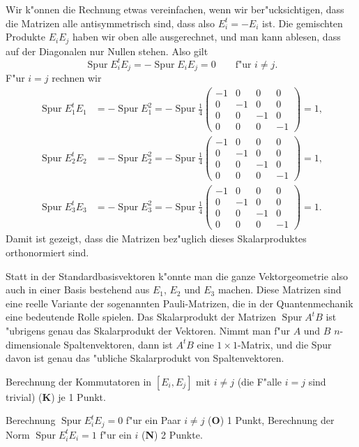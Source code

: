 \begin{loesung}
\begin{teilaufgaben}
Wir k"onnen die Rechnung etwas vereinfachen, wenn wir ber"ucksichtigen,
dass die Matrizen alle antisymmetrisch sind, dass also $E_i^t=-E_i$ ist.
Die gemischten Produkte $E_iE_j$ haben wir oben alle ausgerechnet, und
man kann ablesen, dass auf der Diagonalen nur Nullen stehen. Also gilt
\[
\operatorname{Spur}E_i^tE_j
=
-\operatorname{Spur}E_iE_j=0
\qquad
\text{f"ur $i\ne j$}.
\]
F"ur $i=j$ rechnen wir
\begin{align*}
\operatorname{Spur}E_1^tE_1
&=-\operatorname{Spur}E_1^2
=-\operatorname{Spur}\frac14\begin{pmatrix}
-1& 0& 0& 0\\
 0&-1& 0& 0\\
 0& 0&-1& 0\\
 0& 0& 0&-1
\end{pmatrix}
=1,
\\
\operatorname{Spur}E_2^tE_2
&=-\operatorname{Spur}E_2^2
=-\operatorname{Spur}\frac14\begin{pmatrix}
-1& 0& 0& 0\\
 0&-1& 0& 0\\
 0& 0&-1& 0\\
 0& 0& 0&-1
\end{pmatrix}
=1,
\\
\operatorname{Spur}E_3^tE_3
&=-\operatorname{Spur}E_3^2
=-\operatorname{Spur}\frac14\begin{pmatrix}
-1& 0& 0& 0\\
 0&-1& 0& 0\\
 0& 0&-1& 0\\
 0& 0& 0&-1
\end{pmatrix}
=1.
\end{align*}
Damit ist gezeigt, dass die Matrizen bez"uglich dieses Skalarproduktes
orthonormiert sind.
\qedhere
\end{teilaufgaben}
\end{loesung}

\begin{diskussion}
Statt in der Standardbasisvektoren k"onnte man die ganze Vektorgeometrie
also auch in einer Basis bestehend aus $E_1$, $E_2$ und $E_3$ machen.
Diese Matrizen sind eine reelle Variante der sogenannten
Pauli-Matrizen,
die in der Quantenmechanik eine bedeutende Rolle spielen.
Das Skalarprodukt der Matrizen $\operatorname{Spur}A^tB$ ist "ubrigens
genau das Skalarprodukt der Vektoren. Nimmt man f"ur $A$ und $B$
$n$-dimensionale Spaltenvektoren, dann ist $A^tB$ eine $1\times 1$-Matrix,
und die Spur davon ist genau das "ubliche Skalarprodukt von Spaltenvektoren.
\end{diskussion}

\begin{bewertung}
\begin{teilaufgaben}
\item
Berechnung der Kommutatoren in $[E_i,E_j]$ mit $i\ne j$ (die F"alle
$i=j$ sind trivial) ({\bf K}) je 1 Punkt.
\item
Berechnung $\operatorname{Spur}E_i^tE_j=0$ f"ur ein Paar $i\ne j$ ({\bf O})
1 Punkt,
Berechnung der Norm 
$\operatorname{Spur}E_i^tE_i=1$ f"ur ein $i$ ({\bf N}) 2 Punkte.
\end{teilaufgaben}
\end{bewertung}
